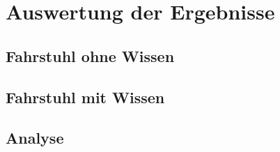 \chapter{Auswertung der Ergebnisse}

\section{Fahrstuhl ohne Wissen}

\section{Fahrstuhl mit Wissen}

\section{Analyse}
